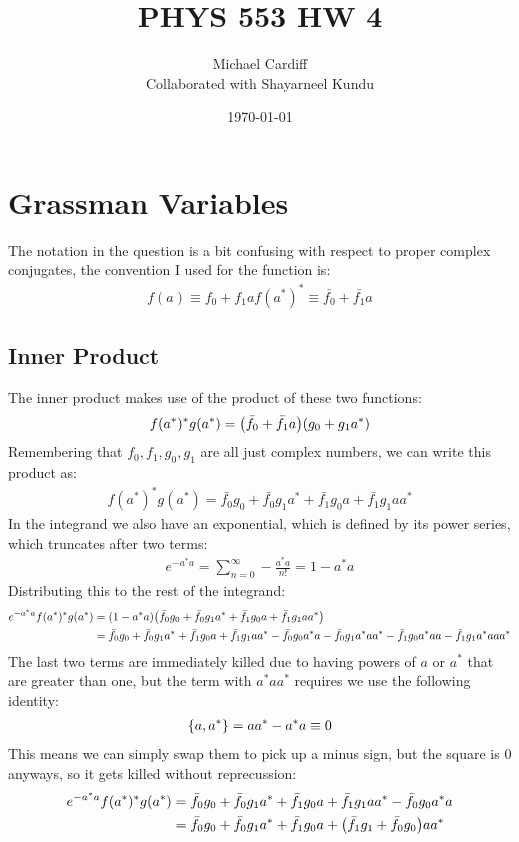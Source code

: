 \documentclass[12pt]{article}
\title{\vspace{-3em}PHYS 553 HW 4}
\author{Michael Cardiff\\Collaborated with Shayarneel Kundu}
\date{\today}
\begin{document}
\maketitle
\section{Grassman Variables}
The notation in the question is a bit confusing with respect to proper complex conjugates, the convention I used for the function is:
\begin{align*}
  f(a)\equiv f_0+f_1a
  f(a^*)^*\equiv \bar{f_0}+\bar{f_1}a
\end{align*}
\subsection{Inner Product}
The inner product makes use of the product of these two functions:
\begin{align*}
  f(a^*)^*g(a^*)=\qty(\bar{f_0}+\bar{f_1}a)(g_0+g_1a^*)
\end{align*}
Remembering that $f_0,f_1,g_0,g_1$ are all just complex numbers, we can write this product as:
\begin{align*}
  f(a^*)^*g(a^*)=\bar{f_0}g_0+\bar{f_0}g_1a^*+\bar{f_1}g_0a+\bar{f_1}g_1aa^*
\end{align*}
In the integrand we also have an exponential, which is defined by its power series, which truncates after two terms:
\begin{align*}
  e^{-a^*a}=\sum_{n=0}^\infty-\frac{a^*a}{n!}=1-a^*a
\end{align*}
Distributing this to the rest of the integrand:
\begin{align*}
  e^{-a^*a}f(a^*)^*g(a^*)&=(1-a^*a)\qty(
  \bar{f_0}g_0+\bar{f_0}g_1a^*+\bar{f_1}g_0a+\bar{f_1}g_1aa^*)\\
  &=\bar{f_0}g_0+\bar{f_0}g_1a^*+\bar{f_1}g_0a+\bar{f_1}g_1aa^*
  -\bar{f_0}g_0a^*a-\bar{f_0}g_1a^*aa^*-\bar{f_1}g_0a^*aa-\bar{f_1}g_1a^*aaa^*\\
\end{align*}
The last two terms are immediately killed due to having powers of $a$ or $a^*$ that are greater than one, but the term with $a^*aa^*$ requires we use the following identity:
\begin{align*}
  \acomm{a}{a^*}=aa^*-a^*a\equiv0
\end{align*}
This means we can simply swap them to pick up a minus sign, but the square is $0$ anyways, so it gets killed without reprecussion:
\begin{align*}
  e^{-a^*a}f(a^*)^*g(a^*)&=\bar{f_0}g_0+\bar{f_0}g_1a^*+\bar{f_1}g_0a
  +\bar{f_1}g_1aa^*-\bar{f_0}g_0a^*a\\
  &=\bar{f_0}g_0+\bar{f_0}g_1a^*+\bar{f_1}g_0a+\qty(\bar{f_1}g_1+\bar{f_0}g_0)aa^*
\end{align*}
\end{document}
